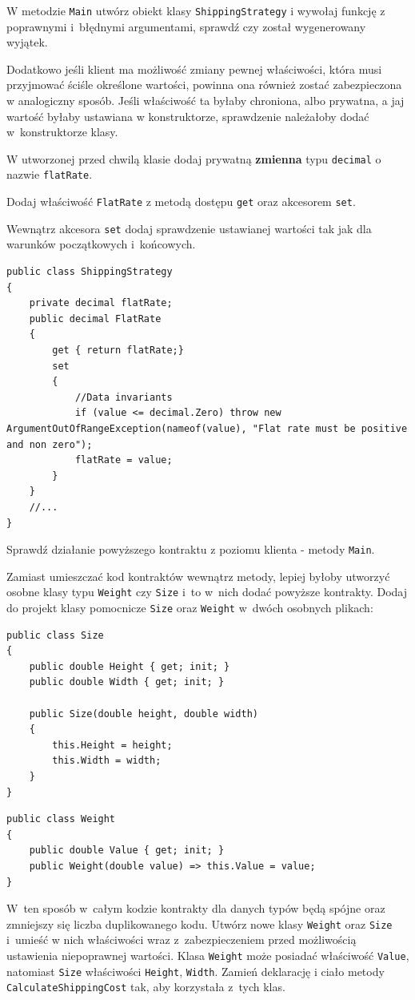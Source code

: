 W metodzie \texttt{Main} utwórz obiekt klasy \texttt{ShippingStrategy} i wywołaj funkcję z poprawnymi i~błędnymi argumentami, sprawdź czy został wygenerowany wyjątek.

Dodatkowo jeśli klient ma możliwość zmiany pewnej właściwości, która musi przyjmować ściśle określone wartości, powinna ona również zostać zabezpieczona w analogiczny sposób. Jeśli właściwość ta byłaby chroniona, albo prywatna, a jaj wartość byłaby ustawiana w konstruktorze, sprawdzenie należałoby dodać w~konstruktorze klasy.

W utworzonej przed chwilą klasie dodaj prywatną \textbf{zmienna} typu \texttt{decimal} o nazwie \texttt{flatRate}.

Dodaj właściwość \texttt{FlatRate} z metodą dostępu \texttt{get} oraz akcesorem \texttt{set}.

Wewnątrz akcesora \texttt{set} dodaj sprawdzenie ustawianej wartości tak jak dla warunków początkowych i~końcowych.
\begin{lstlisting}
public class ShippingStrategy
{
	private decimal flatRate;
	public decimal FlatRate 
	{ 
		get { return flatRate;}
		set
		{
			//Data invariants
			if (value <= decimal.Zero) throw new ArgumentOutOfRangeException(nameof(value), "Flat rate must be positive and non zero");
			flatRate = value;
		}
	}
	//...
}
\end{lstlisting}
Sprawdź działanie powyższego kontraktu z poziomu klienta - metody \texttt{Main}.


Zamiast umieszczać kod kontraktów wewnątrz metody, lepiej byłoby utworzyć osobne klasy typu \texttt{Weight} czy \texttt{Size} i~to w~nich dodać powyższe kontrakty. Dodaj do projekt klasy pomocnicze \texttt{Size} oraz \texttt{Weight} w~dwóch osobnych plikach:
\begin{lstlisting}
public class Size
{
	public double Height { get; init; }
	public double Width { get; init; }
	
	public Size(double height, double width)
	{
		this.Height = height;
		this.Width = width;
	}
}
\end{lstlisting}
\begin{lstlisting}
public class Weight
{
	public double Value { get; init; }	
	public Weight(double value) => this.Value = value;
}
\end{lstlisting}

W~ten sposób w~całym kodzie kontrakty dla danych typów będą spójne oraz zmniejszy się liczba duplikowanego kodu. Utwórz nowe klasy \texttt{Weight} oraz \texttt{Size} i~umieść w nich właściwości wraz z~zabezpieczeniem przed możliwością ustawienia niepoprawnej wartości. Klasa \texttt{Weight} może posiadać właściwość \texttt{Value}, natomiast \texttt{Size} właściwości \texttt{Height}, \texttt{Width}. Zamień deklarację i ciało metody \texttt{CalculateShippingCost} tak, aby korzystała z~tych klas.

